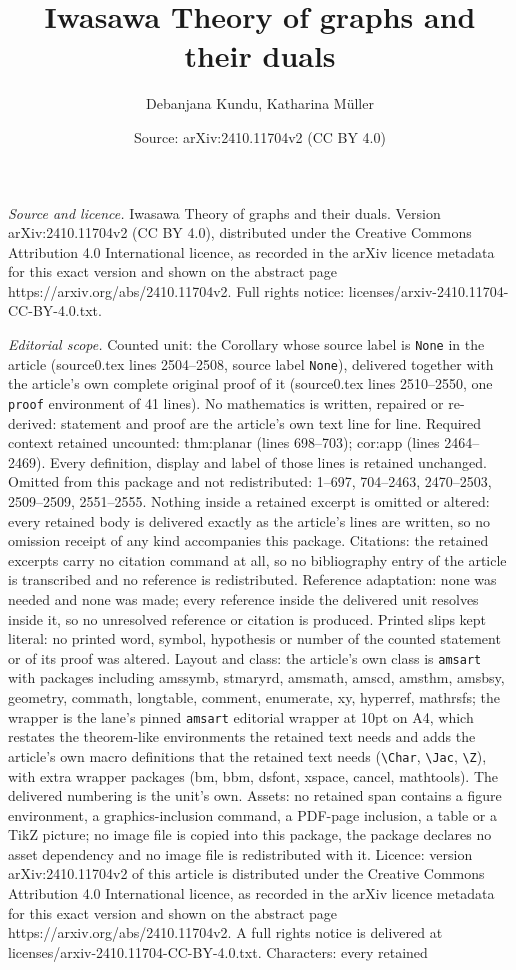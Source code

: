 \documentclass[10pt,a4paper]{amsart}
\title[Iwasawa Theory of graphs and their duals]{Iwasawa Theory of graphs and their duals}
\author{Debanjana Kundu, Katharina M\"uller}
\date{Source: arXiv:2410.11704v2 (CC BY 4.0)}
\begin{document}
\maketitle

\noindent\emph{Source and licence.} Iwasawa Theory of graphs and their duals. Version arXiv:2410.11704v2 (CC BY 4.0), distributed under the Creative Commons Attribution 4.0 International licence, as recorded in the arXiv licence metadata for this exact version and shown on the abstract page https://arxiv.org/abs/2410.11704v2. Full rights notice: licenses/arxiv-2410.11704-CC-BY-4.0.txt.\par\smallskip

\noindent\textit{Editorial scope.} Counted unit: the Corollary whose source label is \texttt{None} in the article (source0.tex lines 2504--2508, source label \texttt{None}), delivered together with the article's own complete original proof of it (source0.tex lines 2510--2550, one \texttt{proof} environment of 41 lines). No mathematics is written, repaired or re-derived: statement and proof are the article's own text line for line. Required context retained uncounted: thm:planar (lines 698--703); cor:app (lines 2464--2469). Every definition, display and label of those lines is retained unchanged. Omitted from this package and not redistributed: 1--697, 704--2463, 2470--2503, 2509--2509, 2551--2555. Nothing inside a retained excerpt is omitted or altered: every retained body is delivered exactly as the article's lines are written, so no omission receipt of any kind accompanies this package. Citations: the retained excerpts carry no citation command at all, so no bibliography entry of the article is transcribed and no reference is redistributed. Reference adaptation: none was needed and none was made; every reference inside the delivered unit resolves inside it, so no unresolved reference or citation is produced. Printed slips kept literal: no printed word, symbol, hypothesis or number of the counted statement or of its proof was altered. Layout and class: the article's own class is \texttt{amsart} with packages including amssymb, stmaryrd, amsmath, amscd, amsthm, amsbsy, geometry, commath, longtable, comment, enumerate, xy, hyperref, mathrsfs; the wrapper is the lane's pinned \texttt{amsart} editorial wrapper at 10pt on A4, which restates the theorem-like environments the retained text needs and adds the article's own macro definitions that the retained text needs (\texttt{\textbackslash Char}, \texttt{\textbackslash Jac}, \texttt{\textbackslash Z}), with extra wrapper packages (bm, bbm, dsfont, xspace, cancel, mathtools). The delivered numbering is the unit's own. Assets: no retained span contains a figure environment, a graphics-inclusion command, a PDF-page inclusion, a table or a TikZ picture; no image file is copied into this package, the package declares no asset dependency and no image file is redistributed with it. Licence: version arXiv:2410.11704v2 of this article is distributed under the Creative Commons Attribution 4.0 International licence, as recorded in the arXiv licence metadata for this exact version and shown on the abstract page https://arxiv.org/abs/2410.11704v2. A full rights notice is delivered at licenses/arxiv-2410.11704-CC-BY-4.0.txt. Characters: every retained 
\end{document}
